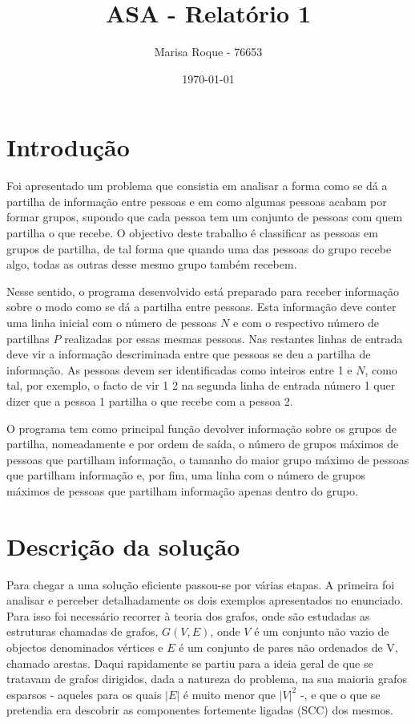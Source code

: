 \documentclass[12pt]{article}
\title{ASA - Relatório 1}
\author{Marisa Roque - 76653}
\date{\today}
\begin{document}
\maketitle


\section*{Introdução}

Foi apresentado um problema que consistia em analisar a forma como se dá a partilha de informação entre pessoas e em como algumas pessoas acabam por formar grupos, supondo que cada pessoa tem um conjunto de pessoas com quem partilha o que recebe. O objectivo deste trabalho é classificar as pessoas em grupos de partilha, de tal forma que quando uma das pessoas do grupo recebe algo, todas as outras desse mesmo grupo também recebem.

Nesse sentido, o programa desenvolvido está preparado para receber informação sobre o modo como se dá a partilha entre pessoas. Esta informação deve conter uma linha inicial com o número de pessoas $N$ e com o respectivo número de partilhas $P$ realizadas por essas mesmas pessoas. Nas restantes linhas de entrada deve vir a informação descriminada entre que pessoas se deu a partilha de informação. As pessoas devem ser identificadas como inteiros entre 1 e $N$, como tal, por exemplo, o facto de vir 1 2 na segunda linha de entrada número 1 quer dizer que a pessoa 1 partilha o que recebe com a pessoa 2.

O programa tem como principal função devolver informação sobre os grupos de partilha, nomeadamente e por ordem de saída, o número de grupos máximos de pessoas que partilham informação, o tamanho do maior grupo máximo de pessoas que partilham informação e, por fim, uma linha com o número de grupos máximos de pessoas que partilham informação apenas dentro do grupo.


\section*{Descrição da solução}

Para chegar a uma solução eficiente passou-se por várias etapas. A primeira foi analisar e perceber detalhadamente os dois exemplos apresentados no enunciado. Para isso foi necessário recorrer à teoria dos grafos, onde são estudadas as estruturas chamadas de grafos, $G(V,E)$, onde $V$ é um conjunto não vazio de objectos denominados vértices e $E$ é um conjunto de pares não ordenados de V, chamado arestas. Daqui rapidamente se partiu para a ideia geral de que se tratavam de grafos dirigidos, dada a natureza do problema, na sua maioria grafos esparsos - aqueles para os quais $|E|$ é muito menor que $|V|^2$ -, e que o que se pretendia era descobrir as componentes fortemente ligadas (SCC) dos mesmos.
\end{document}
